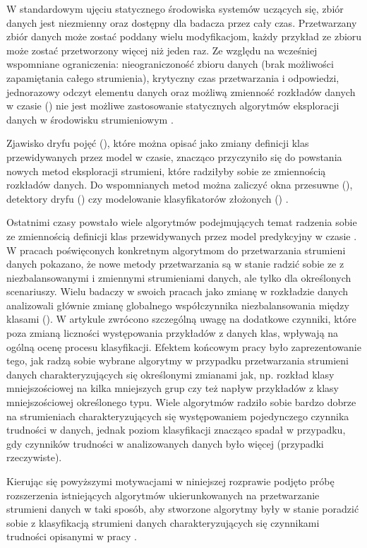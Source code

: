 W standardowym ujęciu statycznego środowiska systemów uczących się, zbiór danych jest niezmienny oraz dostępny dla badacza przez cały czas. Przetwarzany zbiór danych może zostać poddany wielu modyfikacjom, każdy przykład ze zbioru może zostać przetworzony więcej niż jeden raz. Ze względu na wcześniej wspomniane ograniczenia: nieograniczoność zbioru danych (brak możliwości zapamiętania całego strumienia), krytyczny czas przetwarzania i odpowiedzi, jednorazowy odczyt elementu danych oraz możliwą zmienność rozkładów danych w czasie () nie jest możliwe zastosowanie statycznych algorytmów eksploracji danych w środowisku strumieniowym \cite{Article:TradDataStream}\cite{Prezentacja:Strumienie}.

Zjawisko dryfu pojęć (), które można opisać jako zmiany definicji klas przewidywanych przez model w czasie, znacząco przyczyniło się do powstania nowych metod eksploracji strumieni, które radziłyby sobie ze zmiennością rozkładów danych. Do wspomnianych metod można zaliczyć okna przesuwne (), detektory dryfu () czy modelowanie klasyfikatorów złożonych () \cite{DBrzezinski}.

Ostatnimi czasy powstało wiele algorytmów podejmujących temat radzenia sobie ze zmiennością definicji klas przewidywanych przez model predykcyjny w czasie \cite{BrzezPhd2015}\cite{Article:ManyAlgorithms}\cite{Article:OBFirst}\cite{Article:OBSecond}. W pracach poświęconych konkretnym algorytmom do przetwarzania strumieni danych pokazano, że nowe metody przetwarzania są w stanie radzić sobie ze z niezbalansowanymi i zmiennymi strumieniami danych, ale tylko dla określonych scenariuszy. Wielu badaczy w swoich pracach jako zmianę w rozkładzie danych analizowali głównie zmianę globalnego współczynnika niezbalansowania między klasami (). W artykule \cite{Article:TypyPrzykladow} zwrócono szczególną uwagę na dodatkowe czynniki, które poza zmianą liczności występowania przykładów z danych klas, wpływają na ogólną ocenę procesu klasyfikacji. Efektem końcowym pracy było zaprezentowanie tego, jak radzą sobie wybrane algorytmy w przypadku przetwarzania strumieni danych charakteryzujących się określonymi zmianami jak, np. rozkład klasy mniejszościowej na kilka mniejszych grup czy też napływ przykładów z klasy mniejszościowej określonego typu. Wiele algorytmów radziło sobie bardzo dobrze na strumieniach charakteryzujących się występowaniem pojedynczego czynnika trudności w danych, jednak poziom klasyfikacji znacząco spadał w przypadku, gdy czynników trudności w analizowanych danych było więcej (przypadki rzeczywiste).

Kierując się powyższymi motywacjami w niniejszej rozprawie podjęto próbę rozszerzenia istniejących algorytmów ukierunkowanych na przetwarzanie strumieni danych w taki sposób, aby stworzone algorytmy były w stanie poradzić sobie z klasyfikacją strumieni danych charakteryzujących się czynnikami trudności opisanymi w pracy \cite{Article:TypyPrzykladow}.
